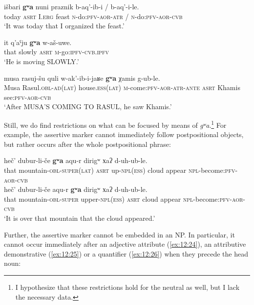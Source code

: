 ﻿\documentclass[output=paper]{langsci/langscibook}
\begin{document}
\ea \label{ex:12:20} %
\gll išbari \textbf{gʷa} nuni praznik b-aq'-ib-i \textup/ b-aq'-i-le.\\
today \textsc{asrt} I.\textsc{erg} feast \textsc{n}-do:\textsc{pfv}-\textsc{aor}-\textsc{atr} / \textsc{n}-do:\textsc{pfv}-\textsc{aor}-\textsc{cvb}\\
\glt `It was today that I organized the feast.'

\ex \label{ex:12:21} %
\gll it q'aˤju \textbf{gʷa} w-aš-uwe.\\
that slowly \textsc{asrt} \textsc{m}-go:\textsc{ipfv}-\textsc{cvb.ipfv}\\
\glt `He is moving SLOWLY.'

\ex \label{ex:12:22} %
\gll musa rasuj-šu quli w-ak'-ib-i-jaʁe \textbf{gʷa} χamis g-ub-le.\\
Musa Rasul.\textsc{obl}-\textsc{ad}(\textsc{lat}) house.\textsc{ess}(\textsc{lat}) \textsc{m}-come:\textsc{pfv}-\textsc{aor}-\textsc{atr}-\textsc{ante} \textsc{asrt} Khamis see:\textsc{pfv}-\textsc{aor}-\textsc{cvb}\\
\glt `After MUSA'S COMING TO RASUL, he saw Khamis.'
\z


Still, we do find restrictions on what can be focused by means of
\emph{gʷa}.\footnote{I hypothesize that these restrictions hold for the
  neutral  as well, but I lack the necessary data.} For example,
the assertive marker cannot immediately follow postpositional objects, but
rather occurs after the whole postpositional phrase:

\ea \label{ex:12:23} %
\ea %
\gll *heč' dubur-li-če \textbf{gʷa} aqu-r dirigʷ хaʔ d-uh-ub-le.\\
that mountain-\textsc{obl}-\textsc{super}(\textsc{lat}) \textsc{asrt} up-\textsc{npl}(\textsc{ess})
cloud appear \textsc{npl}-become:\textsc{pfv}-\textsc{aor}-\textsc{cvb}\\

\ex %
\gll heč' dubur-li-če aqu-r \textbf{gʷa} dirigʷ хaʔ d-uh-ub-le.\\
that mountain-\textsc{obl}-\textsc{super} upper-\textsc{npl}(\textsc{ess}) \textsc{asrt} cloud appear \textsc{npl}-become:\textsc{pfv}-\textsc{aor}-\textsc{cvb}\\
\glt `It is over that mountain that the cloud appeared.'
\z
\z

Further, the assertive marker cannot be embedded in an NP. In
particular, it cannot occur immediately after an adjective attribute (\ref{ex:12:24}),
an attributive demonstrative (\ref{ex:12:25}) or a quantifier (\ref{ex:12:26}) when they
precede the head noun:
\end{document}
